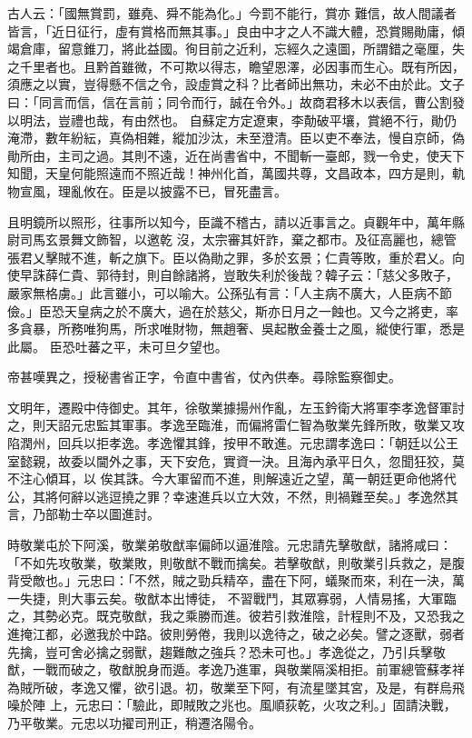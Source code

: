 \begin{pinyinscope}
 古人云：「國無賞罰，雖堯、舜不能為化。」今罰不能行，賞亦
 難信，故人間議者皆言，「近日征行，虛有賞格而無其事。」良由中才之人不識大體，恐賞賜勛庸，傾竭倉庫，留意錐刀，將此益國。徇目前之近利，忘經久之遠圖，所謂錯之毫厘，失之千里者也。且黔首雖微，不可欺以得志，瞻望恩澤，必因事而生心。既有所因，須應之以實，豈得懸不信之令，設虛賞之科？比者師出無功，未必不由於此。文子曰：「同言而信，信在言前；同令而行，誠在令外。」故商君移木以表信，曹公割發以明法，豈禮也哉，有由然也。
 自蘇定方定遼東，李勣破平壤，賞絕不行，勛仍淹滯，數年紛紜，真偽相雜，縱加沙汰，未至澄清。臣以吏不奉法，慢自京師，偽勛所由，主司之過。其則不遠，近在尚書省中，不聞斬一臺郎，戮一令史，使天下知聞，天皇何能照遠而不照近哉！神州化首，萬國共尊，文昌政本，四方是則，軌物宣風，理亂攸在。臣是以披露不已，冒死盡言。



 且明鏡所以照形，往事所以知今，臣識不稽古，請以近事言之。貞觀年中，萬年縣尉司馬玄景舞文飾智，以邀乾
 沒，太宗審其奸詐，棄之都市。及征高麗也，總管張君乂擊賊不進，斬之旗下。臣以偽勛之罪，多於玄景；仁貴等敗，重於君乂。向使早誅薛仁貴、郭待封，則自餘諸將，豈敢失利於後哉？韓子云：「慈父多敗子，嚴家無格虜。」此言雖小，可以喻大。公孫弘有言：「人主病不廣大，人臣病不節儉。」臣恐天皇病之於不廣大，過在於慈父，斯亦日月之一蝕也。又今之將吏，率多貪暴，所務唯狗馬，所求唯財物，無趙奢、吳起散金養士之風，縱使行軍，悉是此屬。
 臣恐吐蕃之平，未可旦夕望也。



 帝甚嘆異之，授秘書省正字，令直中書省，仗內供奉。尋除監察御史。



 文明年，遷殿中侍御史。其年，徐敬業據揚州作亂，左玉鈐衛大將軍李孝逸督軍討之，則天詔元忠監其軍事。孝逸至臨淮，而偏將雷仁智為敬業先鋒所敗，敬業又攻陷潤州，回兵以拒孝逸。孝逸懼其鋒，按甲不敢進。元忠謂孝逸曰：「朝廷以公王室懿親，故委以閫外之事，天下安危，實資一決。且海內承平日久，忽聞狂狡，莫不注心傾耳，以
 俟其誅。今大軍留而不進，則解遠近之望，萬一朝廷更命他將代公，其將何辭以逃逗撓之罪？幸速進兵以立大效，不然，則禍難至矣。」孝逸然其言，乃部勒士卒以圖進討。



 時敬業屯於下阿溪，敬業弟敬猷率偏師以逼淮陰。元忠請先擊敬猷，諸將咸曰：「不如先攻敬業，敬業敗，則敬猷不戰而擒矣。若擊敬猷，則敬業引兵救之，是腹背受敵也。」元忠曰：「不然，賊之勁兵精卒，盡在下阿，蟻聚而來，利在一決，萬一失捷，則大事云矣。敬猷本出博徒，
 不習戰鬥，其眾寡弱，人情易搖，大軍臨之，其勢必克。既克敬猷，我之乘勝而進。彼若引救淮陰，計程則不及，又恐我之進掩江都，必邀我於中路。彼則勞倦，我則以逸待之，破之必矣。譬之逐獸，弱者先擒，豈可舍必擒之弱獸，趨難敵之強兵？恐未可也。」孝逸從之，乃引兵擊敬猷，一戰而破之，敬猷脫身而遁。孝逸乃進軍，與敬業隔溪相拒。前軍總管蘇孝祥為賊所破，孝逸又懼，欲引退。初，敬業至下阿，有流星墜其宮，及是，有群烏飛噪於陣
 上，元忠曰：「驗此，即賊敗之兆也。風順荻乾，火攻之利。」固請決戰，乃平敬業。元忠以功擢司刑正，稍遷洛陽令。




\end{pinyinscope}
